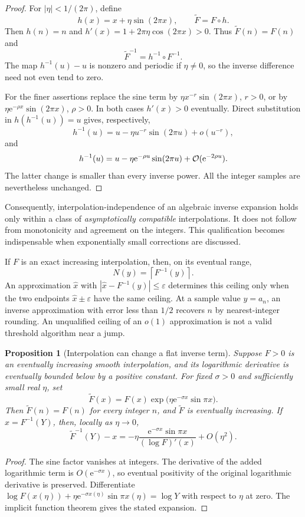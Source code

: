 \documentclass[11pt,openany]{book}
\numberwithin{equation}{chapter}
\theoremstyle{plain}
\newtheorem{proposition}[theorem]{Proposition}
\theoremstyle{definition}
\theoremstyle{remark}
\newcommand{\ee}{\mathrm e}
\begin{document}
\begin{proof}
For $|\eta|<1/(2\pi)$, define
\[
 h(x)=x+\eta\sin(2\pi x),\qquad \widetilde F=F\circ h.
\]
Then $h(n)=n$ and $h'(x)=1+2\pi\eta\cos(2\pi x)>0$. Thus $\widetilde F(n)=F(n)$ and
\[
 \widetilde F^{-1}=h^{-1}\circ F^{-1}.
\]
The map $h^{-1}(u)-u$ is nonzero and periodic if $\eta\ne0$, so the inverse difference need not even tend to zero.

For the finer assertions replace the sine term by $\eta x^{-r}\sin(2\pi x)$, $r>0$, or by $\eta\ee^{-\rho x}\sin(2\pi x)$, $\rho>0$. In both cases $h'(x)>0$ eventually. Direct substitution in $h(h^{-1}(u))=u$ gives, respectively,
\[
 h^{-1}(u)=u-\eta u^{-r}\sin(2\pi u)+o(u^{-r}),
\]
and
\[
 h^{-1}(u)=u-\eta\ee^{-\rho u}\sin(2\pi u)
           +\bigO(\ee^{-2\rho u}).
\]
The latter change is smaller than every inverse power. All the integer samples are nevertheless unchanged.
\end{proof}

Consequently, interpolation-independence of an algebraic inverse expansion holds only within a class of \emph{asymptotically compatible} interpolations. It does not follow from monotonicity and agreement on the integers. This qualification becomes indispensable when exponentially small corrections are discussed.

If $F$ is an exact increasing interpolation, then, on its eventual range,
\begin{equation}
 N(y)=\left\lceil F^{-1}(y)\right\rceil.
 \label{t2:eq:ceil}
\end{equation}
An approximation $\widehat x$ with $|\widehat x-F^{-1}(y)|\le\varepsilon$ determines this ceiling only when the two endpoints $\widehat x\pm\varepsilon$ have the same ceiling. At a sample value $y=a_n$, an inverse approximation with error less than $1/2$ recovers $n$ by nearest-integer rounding. An unqualified ceiling of an $o(1)$ approximation is not a valid threshold algorithm near a jump.
\begin{proposition}[Interpolation can change a flat inverse term]\label{t3:prop:ambiguity}
Suppose $F>0$ is an eventually increasing smooth interpolation, and its logarithmic derivative is eventually bounded below by a positive constant. For fixed $\sigma>0$ and sufficiently small real $\eta$, set
\[
 \widetilde F(x)=F(x)\exp\!\bigl(\eta\ee^{-\sigma x}\sin\pi x\bigr).
\]
Then $\widetilde F(n)=F(n)$ for every integer $n$, and $\widetilde F$ is eventually increasing. If $x=F^{-1}(Y)$, then, locally as $\eta\to0$,
\begin{equation}\label{t3:eq:interpolation-shift}
 \widetilde F^{-1}(Y)-x
 =-\eta\frac{\ee^{-\sigma x}\sin\pi x}{(\log F)'(x)}+O(\eta^2).
\end{equation}
\end{proposition}
\begin{proof}
The sine factor vanishes at integers. The derivative of the added logarithmic term is $O(\ee^{-\sigma x})$, so eventual positivity of the original logarithmic derivative is preserved. Differentiate
$\log F(x(\eta))+\eta\ee^{-\sigma x(\eta)}\sin\pi x(\eta)=\log Y$
with respect to $\eta$ at zero. The implicit function theorem gives the stated expansion.
\end{proof}
\end{document}
